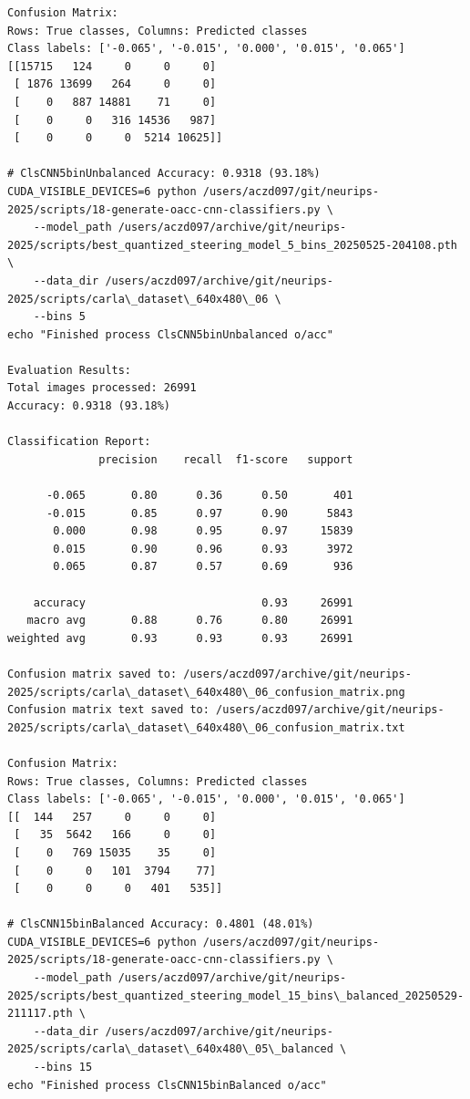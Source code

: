 \begin{verbatim}
Confusion Matrix:
Rows: True classes, Columns: Predicted classes
Class labels: ['-0.065', '-0.015', '0.000', '0.015', '0.065']
[[15715   124     0     0     0]
 [ 1876 13699   264     0     0]
 [    0   887 14881    71     0]
 [    0     0   316 14536   987]
 [    0     0     0  5214 10625]]

# ClsCNN5binUnbalanced Accuracy: 0.9318 (93.18%)
CUDA_VISIBLE_DEVICES=6 python /users/aczd097/git/neurips-2025/scripts/18-generate-oacc-cnn-classifiers.py \
    --model_path /users/aczd097/archive/git/neurips-2025/scripts/best_quantized_steering_model_5_bins_20250525-204108.pth \
    --data_dir /users/aczd097/archive/git/neurips-2025/scripts/carla\_dataset\_640x480\_06 \
    --bins 5
echo "Finished process ClsCNN5binUnbalanced o/acc"

Evaluation Results:
Total images processed: 26991
Accuracy: 0.9318 (93.18%)

Classification Report:
              precision    recall  f1-score   support

      -0.065       0.80      0.36      0.50       401
      -0.015       0.85      0.97      0.90      5843
       0.000       0.98      0.95      0.97     15839
       0.015       0.90      0.96      0.93      3972
       0.065       0.87      0.57      0.69       936

    accuracy                           0.93     26991
   macro avg       0.88      0.76      0.80     26991
weighted avg       0.93      0.93      0.93     26991

Confusion matrix saved to: /users/aczd097/archive/git/neurips-2025/scripts/carla\_dataset\_640x480\_06_confusion_matrix.png
Confusion matrix text saved to: /users/aczd097/archive/git/neurips-2025/scripts/carla\_dataset\_640x480\_06_confusion_matrix.txt

Confusion Matrix:
Rows: True classes, Columns: Predicted classes
Class labels: ['-0.065', '-0.015', '0.000', '0.015', '0.065']
[[  144   257     0     0     0]
 [   35  5642   166     0     0]
 [    0   769 15035    35     0]
 [    0     0   101  3794    77]
 [    0     0     0   401   535]]

# ClsCNN15binBalanced Accuracy: 0.4801 (48.01%)
CUDA_VISIBLE_DEVICES=6 python /users/aczd097/git/neurips-2025/scripts/18-generate-oacc-cnn-classifiers.py \
    --model_path /users/aczd097/archive/git/neurips-2025/scripts/best_quantized_steering_model_15_bins\_balanced_20250529-211117.pth \
    --data_dir /users/aczd097/archive/git/neurips-2025/scripts/carla\_dataset\_640x480\_05\_balanced \
    --bins 15
echo "Finished process ClsCNN15binBalanced o/acc"


\end{verbatim}
